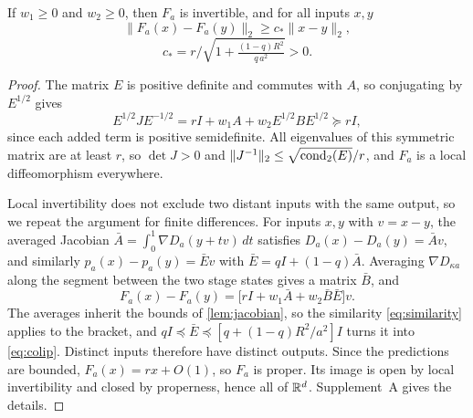 \begin{proposition}
\label{prop:sufficient}
If $w_1\ge0$ and $w_2\ge0$, then $F_a$ is invertible, and for all inputs $x,y$
\begin{equation}
 \|F_a(x)-F_a(y)\|_2\ge c_*\|x-y\|_2,
 \label{eq:colip}
\end{equation}
\begin{equation}
 c_*=r\Big/\sqrt{1+\tfrac{(1-q)R^2}{q\,a^2}}>0 .
 \nonumber
\end{equation}
\end{proposition}
\begin{proof}
The matrix $E$ is positive definite and commutes with $A$, so conjugating by $E^{1/2}$ gives
\begin{equation}
 E^{1/2}JE^{-1/2}
 =rI+w_1A+w_2E^{1/2}BE^{1/2}\succeq rI,
 \label{eq:similarity}
\end{equation}
since each added term is positive semidefinite. All eigenvalues of this symmetric matrix are at least $r$, so $\det J>0$ and $\|J^{-1}\|_2\le\sqrt{\operatorname{cond}_2(E)}/r$, and $F_a$ is a local diffeomorphism everywhere.

Local invertibility does not exclude two distant inputs with the same output, so we repeat the argument for finite differences. For inputs $x,y$ with $v=x-y$, the averaged Jacobian $\bar A=\int_0^1\nabla D_a(y+tv)\,dt$ satisfies $D_a(x)-D_a(y)=\bar Av$, and similarly $p_a(x)-p_a(y)=\bar Ev$ with $\bar E=qI+(1-q)\bar A$. Averaging $\nabla D_{\kappa a}$ along the segment between the two stage states gives a matrix $\bar B$, and
\begin{equation}
 F_a(x)-F_a(y)=\bigl[rI+w_1\bar A+w_2\bar B\bar E\bigr]v .
 \label{eq:finitediff}
\end{equation}
The averages inherit the bounds of \cref{lem:jacobian}, so the similarity \cref{eq:similarity} applies to the bracket, and $qI\preceq\bar E\preceq[q+(1-q)R^2/a^2]I$ turns it into \cref{eq:colip}. Distinct inputs therefore have distinct outputs. Since the predictions are bounded, $F_a(x)=rx+O(1)$, so $F_a$ is proper. Its image is open by local invertibility and closed by properness, hence all of $\mathbb R^d$. Supplement~A gives the details.
\end{proof}

